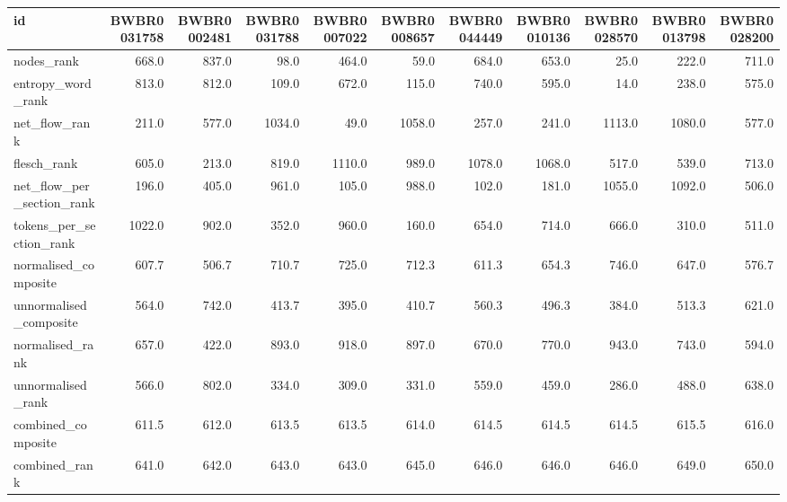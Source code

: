 \begin{tabular}{lrrrrrrrrrr}
\toprule
id & BWBR0031758 & BWBR0002481 & BWBR0031788 & BWBR0007022 & BWBR0008657 & BWBR0044449 & BWBR0010136 & BWBR0028570 & BWBR0013798 & BWBR0028200 \\
\midrule
nodes\_rank & 668.0 & 837.0 & 98.0 & 464.0 & 59.0 & 684.0 & 653.0 & 25.0 & 222.0 & 711.0 \\
\cline{1-11}
entropy\_word\_rank & 813.0 & 812.0 & 109.0 & 672.0 & 115.0 & 740.0 & 595.0 & 14.0 & 238.0 & 575.0 \\
\cline{1-11}
net\_flow\_rank & 211.0 & 577.0 & 1034.0 & 49.0 & 1058.0 & 257.0 & 241.0 & 1113.0 & 1080.0 & 577.0 \\
\cline{1-11}
flesch\_rank & 605.0 & 213.0 & 819.0 & 1110.0 & 989.0 & 1078.0 & 1068.0 & 517.0 & 539.0 & 713.0 \\
\cline{1-11}
net\_flow\_per\_section\_rank & 196.0 & 405.0 & 961.0 & 105.0 & 988.0 & 102.0 & 181.0 & 1055.0 & 1092.0 & 506.0 \\
\cline{1-11}
tokens\_per\_section\_rank & 1022.0 & 902.0 & 352.0 & 960.0 & 160.0 & 654.0 & 714.0 & 666.0 & 310.0 & 511.0 \\
\cline{1-11}
normalised\_composite & 607.7 & 506.7 & 710.7 & 725.0 & 712.3 & 611.3 & 654.3 & 746.0 & 647.0 & 576.7 \\
\cline{1-11}
unnormalised\_composite & 564.0 & 742.0 & 413.7 & 395.0 & 410.7 & 560.3 & 496.3 & 384.0 & 513.3 & 621.0 \\
\cline{1-11}
normalised\_rank & 657.0 & 422.0 & 893.0 & 918.0 & 897.0 & 670.0 & 770.0 & 943.0 & 743.0 & 594.0 \\
\cline{1-11}
unnormalised\_rank & 566.0 & 802.0 & 334.0 & 309.0 & 331.0 & 559.0 & 459.0 & 286.0 & 488.0 & 638.0 \\
\cline{1-11}
combined\_composite & 611.5 & 612.0 & 613.5 & 613.5 & 614.0 & 614.5 & 614.5 & 614.5 & 615.5 & 616.0 \\
\cline{1-11}
combined\_rank & 641.0 & 642.0 & 643.0 & 643.0 & 645.0 & 646.0 & 646.0 & 646.0 & 649.0 & 650.0 \\
\cline{1-11}
\bottomrule
\end{tabular}
